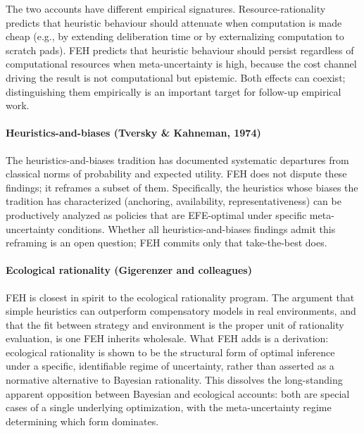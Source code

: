 \documentclass{article}
\begin{document}
The two accounts have different empirical signatures.
Resource-rationality predicts that heuristic behaviour should attenuate
when computation is made cheap (e.g., by extending deliberation time or
by externalizing computation to scratch pads). FEH predicts that
heuristic behaviour should persist regardless of computational resources
when meta-uncertainty is high, because the cost channel driving the
result is not computational but epistemic. Both effects can coexist;
distinguishing them empirically is an important target for follow-up
empirical work.

\paragraph{Heuristics-and-biases (Tversky \& Kahneman,
1974)}\label{heuristics-and-biases-tversky-kahneman-1974}

The heuristics-and-biases tradition \cite{tversky1974} has documented systematic departures
from classical norms of probability and expected utility. FEH does not
dispute these findings; it reframes a subset of them. Specifically, the
heuristics whose biases the tradition has characterized (anchoring,
availability, representativeness) can be productively analyzed as
policies that are EFE-optimal under specific meta-uncertainty
conditions. Whether all heuristics-and-biases findings admit this
reframing is an open question; FEH commits only that take-the-best does.

\paragraph{Ecological rationality (Gigerenzer and
colleagues)}\label{ecological-rationality-gigerenzer-and-colleagues}

FEH is closest in spirit to the ecological rationality program. The
argument that simple heuristics can outperform compensatory models in
real environments, and that the fit between strategy and environment is
the proper unit of rationality evaluation, is one FEH inherits
wholesale. What FEH adds is a derivation: ecological rationality is
shown to be the structural form of optimal inference under a specific,
identifiable regime of uncertainty, rather than asserted as a normative
alternative to Bayesian rationality. This dissolves the long-standing
apparent opposition between Bayesian and ecological accounts: both are
special cases of a single underlying optimization, with the
meta-uncertainty regime determining which form dominates.
\end{document}
